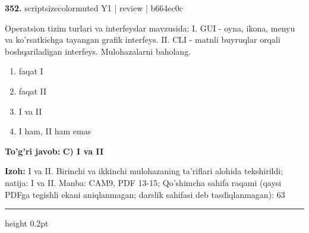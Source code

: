 \documentclass[10pt,a4paper]{article}
\begin{document}
{\bfseries\sffamily\color{ink} 352.} {scriptsizecolor{muted} Y1 | review | b664ec0c}
\par
Operatsion tizim turlari va interfeyslar mavzusida: I. GUI - oyna, ikona, menyu va ko'rsatkichga tayangan grafik interfeys. II. CLI - matnli buyruqlar orqali boshqariladigan interfeys. Mulohazalarni baholang.
\begin{enumerate}[label=\Alph*),leftmargin=9mm]
\item faqat I
\item faqat II
\item I va II
\item I ham, II ham emas
\end{enumerate}
\begin{tcolorbox}[enhanced,breakable,colback=teal!4,colframe=teal!60!black,boxrule=0.45pt,arc=1.2mm,left=2.7mm,right=2.7mm,top=1.8mm,bottom=1.8mm,before skip=2mm,after skip=2mm]
{\bfseries\sffamily\color{teal}To'g'ri javob:} \textbf{C) I va II}
\par\smallskip
{\bfseries Izoh:} I va II. Birinchi va ikkinchi mulohazaning ta'riflari alohida tekshirildi; natija: I va II. Manba: CAM9, PDF 13-15; Qo'shimcha sahifa raqami (qaysi PDFga tegishli ekani aniqlanmagan; darslik sahifasi deb tasdiqlanmagan): 63
\end{tcolorbox}
\vspace{2mm}\hrule height 0.2pt\vspace{3mm}
\end{document}
